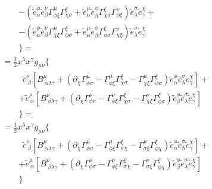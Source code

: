 \documentclass[letterpaper,10pt,english]{jupyterBook}
\begin{document}
\begin{equation}
\begin{split}
\begin{aligned}
 & \qquad \left.
   - \left( \widetilde{e}^{\phi}_{\alpha} \widetilde{e}^{\nu}_{\beta} \Gamma^{\mu}_{\phi \xi} \Gamma^{\xi}_{\chi \sigma} + \widetilde{e}^{\mu}_{\alpha} \widetilde{e}^{\phi}_{\beta} \Gamma^{\xi}_{\chi \sigma} \Gamma^{\nu}_{\phi \xi}
   \right) \widetilde{e}^{\sigma}_{\lambda} \widetilde{e}^{\chi}_{\gamma} \right. + \\
 & \qquad \left.
   - \left( \widetilde{e}^{\phi}_{\alpha} \widetilde{e}^{\nu}_{\beta} \Gamma^{\mu}_{\chi \xi} \Gamma^{\xi}_{\phi \sigma} + \widetilde{e}^{\mu}_{\alpha} \widetilde{e}^{\phi}_{\beta} \Gamma^{\xi}_{\phi \sigma} \Gamma^{\nu}_{\chi \xi}
   \right) \widetilde{e}^{\sigma}_{\lambda} \widetilde{e}^{\chi}_{\gamma} \right. \\ 
 & \qquad \Big\} = \\
 & = \frac{1}{2} x^\lambda x^\gamma g_{\mu \nu}
 \Big\{ \\
  & \qquad \ \ \left.
                    \widetilde{e}^{\nu}_{\ \beta } \left[ B^{\mu}_{\ \alpha \lambda \gamma} + \left( \partial_{\chi} \Gamma^{\mu}_{\phi \sigma} - \Gamma^{\mu}_{\phi \xi} \Gamma^{\xi}_{\chi \sigma} - \Gamma^{\mu}_{\chi \xi} \Gamma^{\xi}_{\phi \sigma} \right) \widetilde{e}^{\phi}_{\alpha} \widetilde{e}^{\sigma}_{\lambda} \widetilde{e}^{\chi}_{\gamma} \right] + \right. \\
  & \qquad \left. + \widetilde{e}^{\mu}_{\ \alpha} \left[ B^{\nu}_{\ \beta  \lambda \gamma} + \left( \partial_{\chi} \Gamma^{\nu}_{\phi \sigma} - \Gamma^{\nu}_{\phi \xi} \Gamma^{\xi}_{\chi \sigma} - \Gamma^{\nu}_{\chi \xi} \Gamma^{\xi}_{\phi \sigma} \right) \widetilde{e}^{\phi}_{\beta } \widetilde{e}^{\sigma}_{\lambda} \widetilde{e}^{\chi}_{\gamma}  \right] \right. \\
 & \qquad \Big\} = \\
 & = \frac{1}{2} x^\lambda x^\gamma g_{\mu \nu}
 \Big\{ \\
  & \qquad \ \ \left.
                    \widetilde{e}^{\nu}_{\ \beta } \left[ B^{\mu}_{\ \alpha \lambda \gamma} + \left( \partial_{\chi} \Gamma^{\mu}_{\phi \sigma} - \Gamma^{\mu}_{\phi \xi} \Gamma^{\xi}_{ \sigma \chi} - \Gamma^{\mu}_{\sigma \xi} \Gamma^{\xi}_{\phi \chi} \right) \widetilde{e}^{\phi}_{\alpha} \widetilde{e}^{\sigma}_{\lambda} \widetilde{e}^{\chi}_{\gamma} \right] + \right. \\
  & \qquad \left. + \widetilde{e}^{\mu}_{\ \alpha} \left[ B^{\nu}_{\ \beta  \lambda \gamma} + \left( \partial_{\chi} \Gamma^{\nu}_{\phi \sigma} - \Gamma^{\nu}_{\phi \xi} \Gamma^{\xi}_{ \sigma \chi} - \Gamma^{\nu}_{\sigma \xi} \Gamma^{\xi}_{\phi \chi} \right) \widetilde{e}^{\phi}_{\beta } \widetilde{e}^{\sigma}_{\lambda} \widetilde{e}^{\chi}_{\gamma}  \right] \right. \\
 & \qquad \Big\}
\end{aligned}\end{split}
\end{equation}
\end{document}
